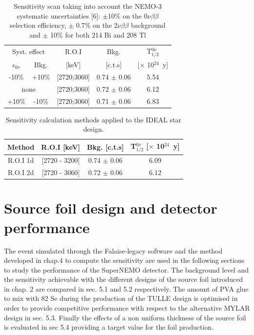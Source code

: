 \documentclass[main.tex]{subfiles}
\begin{document}
\begin{table}
\centering
\begin{tabular}{c|c|c|c|c}
\multicolumn{2}{c|}{Syst. effect} & R.O.I & Bkg. & T$_{\text{1/2}}^{\text{0}\nu}$ \\
$\epsilon_{\text{0}\nu}$ & Bkg. & [keV] & [c.t.s] & [$\times$ 10$^{\text{24}}$~y] \\[0.1cm]
\toprule
-10\%                    & +10\% & [2720;3060] & 0.74 $\pm$ 0.06 & 5.54 \\[0.1cm]
\hline
\multicolumn{2}{c|}{none}   & [2720;3060] & 0.72 $\pm$ 0.06 & 6.12 \\[0.1cm]
\hline
+10\%                    & -10\% &[2720;3060] & 0.71 $\pm$ 0.06 & 6.83 \\[0.1cm]
\bottomrule
\end{tabular}
\caption{Sensitivity scan taking into account the NEMO-3 systematic uncertainties [6]: $\pm$10\% on the 0$\nu\beta\beta$ selection efficiency, $\pm$ 0.7\% on the 2$\nu\beta\beta$ background and $\pm$ 10\% for both 214 Bi and 208 Tl}
\label{Tab:SystUncertaintiesSourceFoil}
\end{table}


\begin{table}
\centering
\begin{tabular}{c|c|c|c}
\toprule
Method & R.O.I [keV] & Bkg. [c.t.s] & T$_{\text{1/2}}^{\text{0}\nu}$ [$\times$ 10$^{\text{24}}$~y] \\[0.1cm]
\hline
R.O.I 1d & [2720 - 3200] & 0.74 $\pm$ 0.06 & 6.09 \\ [0.1cm]
R.O.I 2d & [2720 - 3060] & 0.72 $\pm$ 0.06 & 6.12 \\ [0.1cm]
\bottomrule
\end{tabular}
\caption{Sensitivity calculation methods applied to the IDEAL star design.}
\label{Tab:SensCalculationIDEAL}
\end{table}


\section{Source foil design and detector performance}\label{sec:SourceFoilDesignDetectorPerformance}


\NI The event simulated through the Falaise-legacy software and the method developed in chap.4 to compute the sensitivity are used in the following sections to study the performance of the SuperNEMO detector. The background level and the sensitivity achievable with the different designs of the source foil introduced in chap. 2 are compared in sec. 5.1 and 5.2 respectively. The amount of PVA glue to mix with 82 Se during the production of the TULLE design is optimised in order to provide competitive performance with respect to the alternative MYLAR design in sec. 5.3. Finally the effects of a non uniform thickness of the source foil is evaluated in sec 5.4 providing a target value for the foil production.
\end{document}
